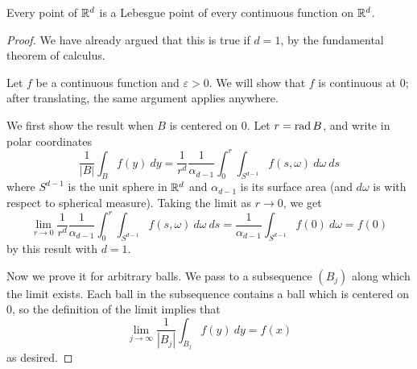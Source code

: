 \begin{lemma}\label{fundamental continuous theorem}
Every point of $\mathbb{R}^d$ is a Lebesgue point of every continuous function on $\mathbb{R}^d$.
\end{lemma}
\begin{proof}
We have already argued that this is true if $d = 1$, by the fundamental theorem of calculus.

Let $f$ be a continuous function and $\varepsilon > 0$.
We will show that $f$ is continuous at $0$; after translating, the same argument applies anywhere.

We first show the result when $B$ is centered on $0$.
Let $r = \operatorname{rad} B$, and write in polar coordinates
$$\frac{1}{|B|} \int_B f(y) ~dy = \frac{1}{r^d} \frac{1}{\alpha_{d - 1}} \int_0^r \int_{S^{d - 1}} f(s, \omega) ~d\omega ~ds$$
where $S^{d-1}$ is the unit sphere in $\mathbb{R}^d$ and $\alpha_{d - 1}$ is its surface area (and $d\omega$ is with respect to spherical measure).
Taking the limit as $r \to 0$, we get
$$\lim_{r \to 0}\frac{1}{r^d} \frac{1}{\alpha_{d - 1}} \int_0^r \int_{S^{d - 1}} f(s, \omega) ~d\omega ~ds = \frac{1}{\alpha_{d - 1}} \int_{S^{d - 1}} f(0) ~d\omega = f(0)$$
by this result with $d = 1$.

Now we prove it for arbitrary balls.
We pass to a subsequence $(B_j)$ along which the limit exists. Each ball in the subsequence contains a ball which is centered on $0$, so the definition of the limit implies that
$$\lim_{j \to \infty} \frac{1}{|B_j|} \int_{B_j} f(y) ~dy = f(x)$$
as desired.
\end{proof}

